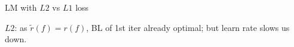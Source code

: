 \begin{frame}{LM with $L2$ vs $L1$ loss}

\vfill

\footnotesize
$L2$: as $\tilde r(f) = r(f)$, BL of 1st iter already optimal; 
but learn rate slows us down.

\end{frame}
% 
% 
% 
% 
% 
% 
% 
% 
% 
% 
% 
% 
% 

